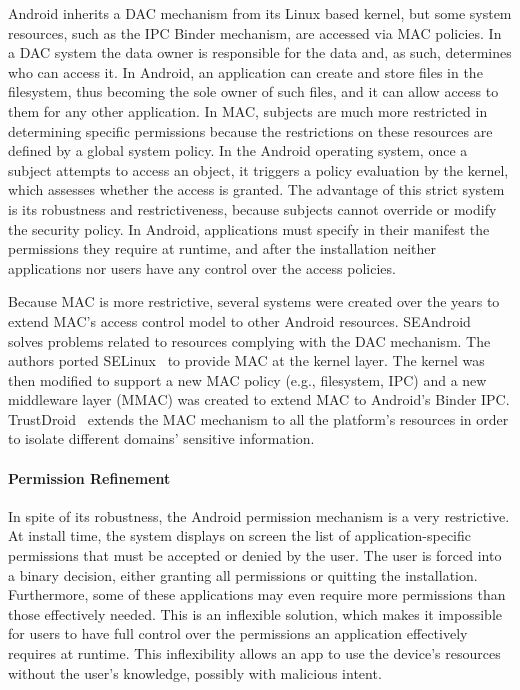 Android inherits a \ac{DAC} mechanism from its Linux based kernel, but some system resources, such as the IPC Binder mechanism, are accessed via \ac{MAC} policies. In a \ac{DAC} system the data owner is responsible for the data and, as such, determines who can access it. In Android, an application can create and store files in the filesystem, thus becoming the sole owner of such files, and it can allow access to them for any other application. In \ac{MAC}, subjects are much more restricted in determining specific permissions because the restrictions on these resources are defined by a global system policy. In the Android operating system, once a subject attempts to access an object, it triggers a policy evaluation by the kernel, which assesses whether the access is granted. The advantage of this strict system is its robustness and restrictiveness, because subjects cannot override or modify the security policy. In Android, applications must specify in their manifest the permissions they require at runtime, and after the installation neither applications nor users have any control over the access policies.

Because \ac{MAC} is more restrictive, several systems were created over the years to extend \ac{MAC}'s access control model to other Android resources. SEAndroid~\cite{smalley2013security} solves problems related to resources complying with the \ac{DAC} mechanism. The authors ported SELinux~\cite{peter2001integrating} to provide \ac{MAC} at the kernel layer. The kernel was then modified to support a new \ac{MAC} policy (e.g., filesystem, IPC) and a new middleware layer (MMAC) was created to extend \ac{MAC} to Android's Binder IPC. TrustDroid~\cite{bugiel2011practical} extends the \ac{MAC} mechanism to all the platform's resources in order to isolate different domains' sensitive information.

\paragraph{\textbf{Permission Refinement}}

In spite of its robustness, the Android permission mechanism is a very restrictive. At install time, the system displays on screen the list of application-specific permissions that must be accepted or denied by the user. The user is forced into a binary decision, either granting all permissions or quitting the installation. Furthermore, some of these applications may even require more permissions than those effectively needed. This is an inflexible solution, which makes it impossible for users to have full control over the permissions an application effectively requires at runtime. This inflexibility allows an app to use the device's resources without the user's knowledge, possibly with malicious intent.

